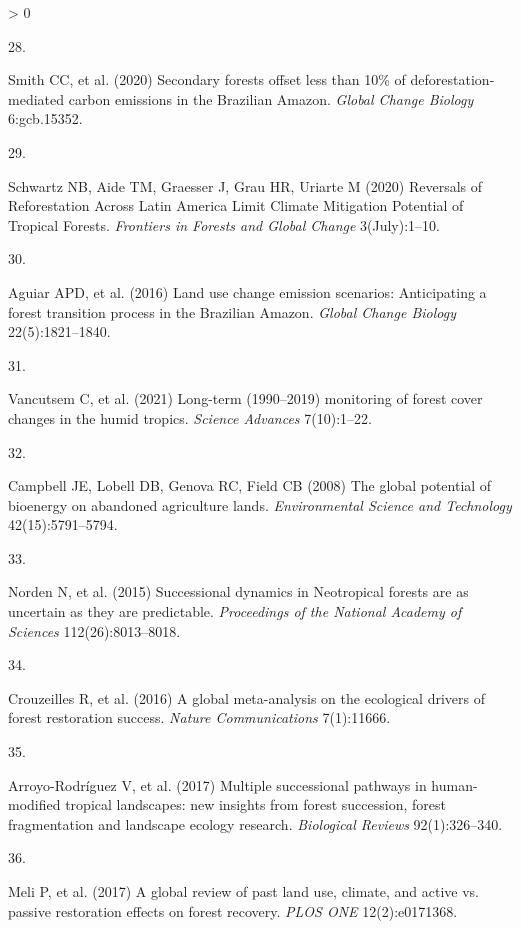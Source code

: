 \documentclass[9pt,twocolumn,twoside,]{pnas-new}
\newlength{\csllabelwidth}
\newlength{\cslhangindent}
\newenvironment{CSLReferences}[2] %
 {%
  \setlength{\parindent}{0pt}
  \ifodd #1 \everypar{\setlength{\hangindent}{\cslhangindent}}\ignorespaces\fi
  \ifnum #2 > 0
  \setlength{\parskip}{#2\baselineskip}
  \fi
 }%
 {}
\newcommand{\CSLLeftMargin}[1]{\parbox[t]{\csllabelwidth}{#1}}
\newcommand{\CSLRightInline}[1]{\parbox[t]{\linewidth - \csllabelwidth}{#1}\break}
\begin{document}
\begin{CSLReferences}{0}{0}
\leavevmode\hypertarget{ref-Smith2020}{}%
\CSLLeftMargin{28. }
\CSLRightInline{Smith CC, et al. (2020) {Secondary forests offset less than 10{\%} of deforestation‐mediated carbon emissions in the Brazilian Amazon}. \emph{Global Change Biology} 6:gcb.15352.}

\leavevmode\hypertarget{ref-Schwartz2020}{}%
\CSLLeftMargin{29. }
\CSLRightInline{Schwartz NB, Aide TM, Graesser J, Grau HR, Uriarte M (2020) {Reversals of Reforestation Across Latin America Limit Climate Mitigation Potential of Tropical Forests}. \emph{Frontiers in Forests and Global Change} 3(July):1--10.}

\leavevmode\hypertarget{ref-Aguiar2016}{}%
\CSLLeftMargin{30. }
\CSLRightInline{Aguiar APD, et al. (2016) {Land use change emission scenarios: Anticipating a forest transition process in the Brazilian Amazon}. \emph{Global Change Biology} 22(5):1821--1840.}

\leavevmode\hypertarget{ref-Vancutsem2021}{}%
\CSLLeftMargin{31. }
\CSLRightInline{Vancutsem C, et al. (2021) {Long-term (1990--2019) monitoring of forest cover changes in the humid tropics}. \emph{Science Advances} 7(10):1--22.}

\leavevmode\hypertarget{ref-Campbell2008}{}%
\CSLLeftMargin{32. }
\CSLRightInline{Campbell JE, Lobell DB, Genova RC, Field CB (2008) {The global potential of bioenergy on abandoned agriculture lands}. \emph{Environmental Science and Technology} 42(15):5791--5794.}

\leavevmode\hypertarget{ref-Norden2015}{}%
\CSLLeftMargin{33. }
\CSLRightInline{Norden N, et al. (2015) {Successional dynamics in Neotropical forests are as uncertain as they are predictable}. \emph{Proceedings of the National Academy of Sciences} 112(26):8013--8018.}

\leavevmode\hypertarget{ref-Crouzeilles2016}{}%
\CSLLeftMargin{34. }
\CSLRightInline{Crouzeilles R, et al. (2016) {A global meta-analysis on the ecological drivers of forest restoration success}. \emph{Nature Communications} 7(1):11666.}

\leavevmode\hypertarget{ref-Arroyo-Rodriguez2017}{}%
\CSLLeftMargin{35. }
\CSLRightInline{Arroyo-Rodríguez V, et al. (2017) {Multiple successional pathways in human-modified tropical landscapes: new insights from forest succession, forest fragmentation and landscape ecology research}. \emph{Biological Reviews} 92(1):326--340.}

\leavevmode\hypertarget{ref-Meli2017}{}%
\CSLLeftMargin{36. }
\CSLRightInline{Meli P, et al. (2017) {A global review of past land use, climate, and active vs. passive restoration effects on forest recovery}. \emph{PLOS ONE} 12(2):e0171368.}


\end{CSLReferences}
\end{document}

